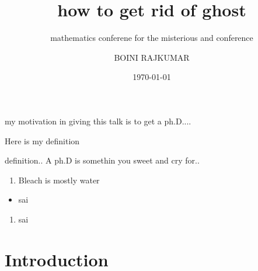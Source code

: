 \documentclass{beamer}
\title{how to get rid of ghost}
\subtitle{mathematics conferene for the misterious and conference}
\author{BOINI RAJKUMAR}
\date{\today}
\begin{document}
\begin{frame}
    \maketitle
\end{frame}
\begin{frame}
    my motivation in giving this talk is to get a ph.D....
\end{frame}
\begin{frame}[t]
    \vspace{2cm}
    Here is my definition
    \begin{block}{definition..}
    A ph.D is somethin you sweet and cry for..
    \end{block}
\end{frame}
\begin{frame}
    \begin{enumerate}
        \item Bleach is mostly water
    \end{enumerate}
    \begin{itemize}
        \item sai
    \end{itemize}
    \begin{enumerate}
        \item sai
    \end{enumerate}
\end{frame}
    
\section{Introduction}
\end{document}
